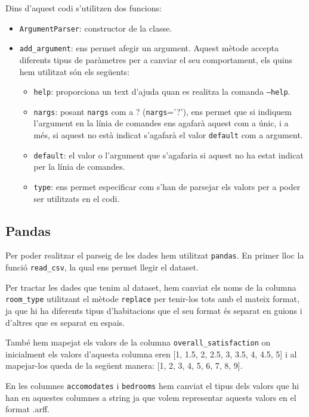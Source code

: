 \documentclass[../informe.tex]{subfiles}
\begin{document}
    Dins d'aquest codi s'utilitzen dos funcions:
    \begin{itemize}
        \item \texttt{ArgumentParser}: constructor de la classe.
        \item \texttt{add\_argument}: ens permet afegir un argument. Aquest mètode accepta diferents tipus de paràmetres per a canviar el seu comportament, els quins hem utilitzat són els següents:
        \begin{itemize}
            \item \texttt{help}: proporciona un text d'ajuda quan es realitza la comanda \texttt{--help}.
            \item \texttt{nargs}: posant \texttt{nargs} com a ? (\texttt{nargs}='?'), ens permet que si indiquem l'argument en la línia de comandes ens agafarà aquest com a únic, i a més, si aquest no està indicat s'agafarà el valor \texttt{default} com a argument.
            \item \texttt{default}: el valor o l'argument que s'agafaria si aquest no ha estat indicat per la línia de comandes.
            \item \texttt{type}: ens permet especificar com s'han de parsejar els valors per a poder ser utilitzats en el codi.
        \end{itemize}
    \end{itemize}

    \subsection{Pandas}
    Per poder realitzar el parseig de les dades hem utilitzat \texttt{pandas}. En primer lloc la funció \texttt{read\_csv}, la qual ens permet llegir el dataset. 
    
    \medskip
    Per tractar les dades que tenim al dataset, hem canviat els noms de la columna \texttt{room\_type} utilitzant el mètode \texttt{replace} per tenir-los tots amb el mateix format, ja que hi ha diferents tipus d'habitacions que el seu format és separat en guions i d'altres que es separat en espais. 
    
    \medskip
    També hem mapejat els valors de la columna \texttt{overall\_satisfaction} on inicialment els valors d'aquesta columna eren [1, 1.5, 2, 2.5, 3, 3.5, 4, 4.5, 5] i al mapejar-los queda de la següent manera: [1, 2, 3, 4, 5, 6, 7, 8, 9].

    \medskip
    En les columnes \texttt{accomodates} i \texttt{bedrooms} hem canviat el tipus dels valors que hi han en aquestes columnes a string ja que volem representar aquests valors en el format .arff.
\end{document}
